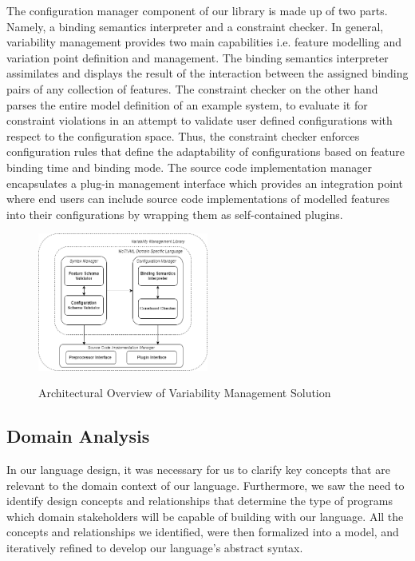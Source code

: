 \documentclass[conference]{IEEEtran}
\begin{document}
The configuration manager component of our library is made up of two parts. Namely, a binding semantics interpreter and a constraint checker. In general, variability management provides two main capabilities i.e. feature modelling and variation point definition and management. The binding semantics interpreter assimilates and displays the result of the interaction between the assigned binding pairs of any collection of features. The constraint checker on the other hand parses the entire model definition of an example system, to evaluate it for constraint violations in an attempt to validate user defined configurations with respect to the configuration space. Thus, the constraint checker enforces configuration rules that define the adaptability of configurations based on feature binding time and binding mode.
The source code implementation manager encapsulates a plug-in management interface which provides an integration point where end users can include source code implementations of modelled features into their configurations by wrapping them as self-contained plugins.

\begin{figure}[H]
\caption{Architectural Overview of Variability Management Solution}
\centering
\includegraphics[width=0.5\textwidth]{diagrams/arch-overview.png}
\label{arch-over}
\end{figure}

\subsection{Domain Analysis}
In our language design, it was necessary for us to clarify key concepts that are relevant to the domain context of our language. Furthermore, we saw the need to identify design concepts and relationships that determine the type of programs which domain stakeholders will be capable of building with our language. All the concepts and relationships we identified, were then formalized into a model, and iteratively refined to develop our language's abstract syntax.
\end{document}
